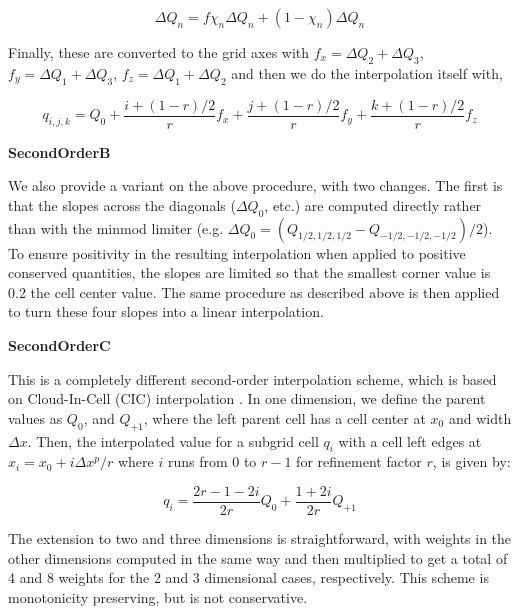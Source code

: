 \begin{equation}
\Delta Q_n = f \chi_n \Delta Q_n + (1-\chi_n) \Delta Q_n
\end{equation}

Finally, these are converted to the grid axes with $f_x = \Delta Q_2 +
\Delta Q_3$, $f_y = \Delta Q_1 + \Delta Q_3$, $f_z = \Delta Q_1 +
\Delta Q_2$ and then we do the interpolation itself with,

\begin{equation}
q_{i,j,k} = Q_0 + \frac{i+(1-r)/2}{r} f_x + \frac{j+(1-r)/2}{r} f_y + \frac{k+(1-r)/2}{r} f_z
\end{equation}


\vspace{0.3cm}\noindent
{\bf SecondOrderB} 

We also provide a variant on the above procedure, with two changes.
The first is that the slopes across the diagonals ($\Delta Q_0$, etc.)
are computed directly rather than with the minmod limiter
(e.g. $\Delta Q_0 = (Q_{1/2,1/2,1/2} - Q_{-1/2,-1/2,-1/2})/2$).  To
ensure positivity in the resulting interpolation when applied to
positive conserved quantities, the slopes are limited so that the
smallest corner value is 0.2 the cell center value.  The same
procedure as described above is then applied to turn these four slopes
into a linear interpolation.


\vspace{0.3cm}\noindent
{\bf SecondOrderC} 

This is a completely different second-order interpolation scheme,
which is based on Cloud-In-Cell (CIC) interpolation \citep{Hockney88}.
In one dimension, we define the parent values as $Q_0$, and $Q_{+1}$,
where the left parent cell has a cell center at $x_0$ and width
$\Delta x$.  Then, the interpolated value for a subgrid cell $q_i$
with a cell left edges at $x_i = x_0 + i \Delta x^p/r$ where $i$ runs
from 0 to $r-1$ for refinement factor $r$, is given by:

\begin{equation}
q_i =  \frac{2r - 1 - 2i}{2r} Q_0 + \frac{1+2i}{2r} Q_{+1}
\end{equation}

The extension to two and three dimensions is straightforward, with
weights in the other dimensions computed in the same way and then
multiplied to get a total of 4 and 8 weights for the 2 and 3
dimensional cases, respectively.  This scheme is monotonicity
preserving, but is not conservative.

